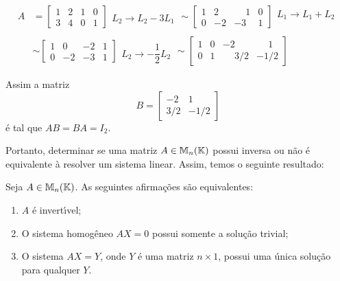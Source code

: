 \begin{align*}
	A &= \left[
			\begin{array}{cc|cc}
		        1 & 2 & 1 & 0 \\
		        3 & 4 & 0 & 1
    		\end{array}
    	\right]
    	\begin{array}{l}
    	\\
        L_2 \to L_2 - 3L_1
    	\end{array} \sim
    \left[
    	\begin{array}{cc|cc}
    		1 &  2 & \phantom{-}1 & 0 \\
        	0 &  -2 & -3 & 1
    	\end{array}
    \right]
    \begin{array}{l}
        L_1 \to L_1 + L_2\\
    \end{array}\\ \\ &\sim
    \left[
    	\begin{array}{cc|cc}
        	1 &  0 & -2 & 1 \\
        	0 &  -2 & -3 & 1
    	\end{array}
    \right]
    \begin{array}{l}
        \\
        L_2 \to -\dfrac{1}{2}L_2
    \end{array} \sim
    \left[
    	\begin{array}{cc|cc}
    		1 &  0 & -2 & \phantom{-}1 \\
        	0 &  1 & \phantom{-}3/2 & -1/2
    	\end{array}
    \right]
\end{align*}


Assim a matriz
\[
	B =
	\begin{bmatrix}
		-2 & 1 \\
		3/2 & -1/2
	\end{bmatrix}
\]
\'e tal que $AB = BA = I_2$.

Portanto, determinar se uma matriz $A \in \mathbb{M}_n(\mathbb{K})$ possui inversa ou n\~ao \'e equivalente \`a resolver um sistema linear. Assim, temos o seguinte resultado:
\begin{teorema}
	Seja $A \in \mathbb{M}_n(\mathbb{K})$. As seguintes afirma\c{c}\~oes s\~ao equivalentes:
	\begin{enumerate}[label={\roman*})]
		\item $A$ \'e invert{\'\i}vel;
		\item O sistema homog\^eneo $AX = 0$ possui somente a solu\c{c}\~ao trivial;
		\item O sistema $AX = Y$, onde $Y$ \'e uma matriz $n \times 1$, possui uma \'unica solu\c{c}\~ao para qualquer $Y$.
	\end{enumerate}
\end{teorema}


